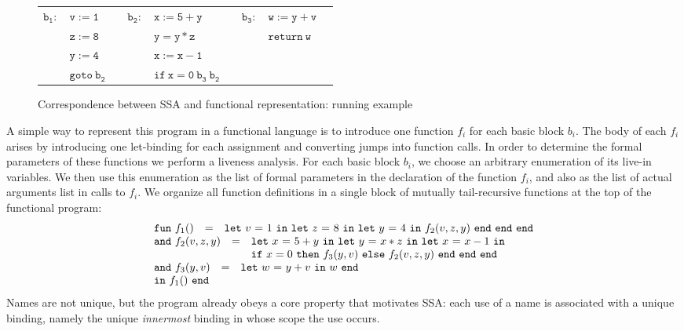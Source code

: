 \begin{figure}
\begin{tabular}{rlcrlcrll}
$\mathtt{b_1:}$ & $\mathtt{v:=1}$ & \quad &
  $\mathtt{b_2:}$ & $\mathtt{x:=5+y}$ & \quad &
  $\mathtt{b_3:}$ & $\mathtt{w:=y+v}$\\
& $\mathtt{z:=8}$ & & & $\mathtt{y=y*z}$ & & & $\mathtt{return\ w}$\\
& $\mathtt{y:=4}$ & & & $\mathtt{x:=x-1}$\\
& $\mathtt{goto}\ \mathtt{b_2}$ & & & $\mathtt{if\ x=0\ b_3\ b_2}$
\end{tabular}
\caption{\label{fig:FunctionalCorrespondenceRunningExample} Correspondence between SSA and functional representation: running example}
\end{figure}

A simple way to represent this program in a functional language is to
introduce one function $f_i$ for each basic block $b_i$. The body of
each $f_i$ arises by introducing one let-binding for each assignment
and converting jumps into function calls. In order to determine the
formal parameters of these functions we perform a liveness
analysis. For each basic block $b_i$, we choose an arbitrary
enumeration of its live-in variables. We then use this enumeration as
the list of formal parameters in the declaration of the function
$f_i$, and also as the list of actual arguments list in calls to
$f_i$. We organize all function definitions in a single block of
mutually tail-recursive functions at the top of the functional
program: 
$$\begin{array}{l}
\begin{array}{lcl}
  \mathtt{fun}\ f_1() & = &
   \letin v 1 {
              \letin z 8 {
                 \letin y 4 {\call {f_2} {v,z,y}}
              }
            }
\end{array}\\
\begin{array}{lcl}
\mathtt{and}\ f_2(v,z,y) & = & 
  \letinD x {5+y} {
              \letinD y {x*z} {
                 \letinD x {x-1} {}}}\\ & & 
   \ite {x=0} {\call {f_3} {y,v}} 
              {\call {f_2} {v,z,y}}\ \mathtt{end}\ \mathtt{end}\ \mathtt{end}
\end{array}\\
\begin{array}{lcl}
  \mathtt{and}\ f_3(y,v) & = & \letin w {y+v} w\\
  \mathtt{in}\ f_1()\ \mathtt{end}
\end{array} 
\end{array}
$$ Names are not unique, but the program already obeys a core
property that motivates SSA: each use of a name is associated with a
unique binding, namely the unique \emph{innermost} binding in whose
scope the use occurs.

